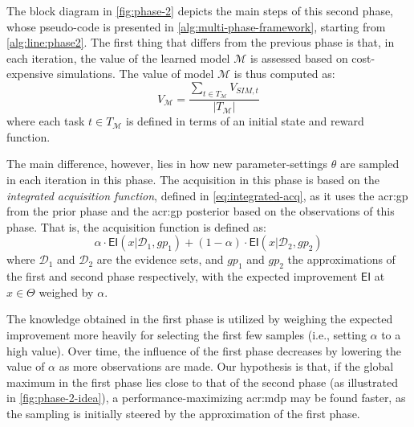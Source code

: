 The block diagram in \autoref{fig:phase-2} depicts the main steps of this second phase, whose pseudo-code is presented in \autoref{alg:multi-phase-framework}, starting from \autoref{alg:line:phase2}.
The first thing that differs from the previous phase is that, in each iteration, the value of the learned model $\mathcal{M}$ is assessed based on cost-expensive simulations.
The value of model $\mathcal{M}$ is thus computed as:
\begin{equation*}
V_\mathcal{M} = \frac{\sum_{t \in T_\mathcal{M}} V_{\mathit{SIM}, t}}{|T_\mathcal{M}|}
\end{equation*}
\noindent where each task $t \in T_\mathcal{M}$ is defined in terms of an initial state and reward function.

The main difference, however, lies in how new parameter-settings $\theta$ are sampled in each iteration in this phase.
The acquisition in this phase is based on the \textit{integrated acquisition function}, defined in \autoref{eq:integrated-acq}, as it uses the \acrshort{acr:gp} from the prior phase and the \acrshort{acr:gp} posterior based on the observations of this phase.
That is, the acquisition function is defined as:
$$\alpha\cdot\mathsf{EI}(x\vert\mathcal{D}_1, \mathit{gp}_1) + (1 - \alpha)\cdot\mathsf{EI}(x\vert\mathcal{D}_2, \mathit{gp}_2)$$
\noindent where $\mathcal{D}_1$ and $\mathcal{D}_2$ are the evidence sets, and $\mathit{gp}_1$ and $\mathit{gp}_2$ the  approximations of the first and second phase respectively, with the expected improvement $\mathsf{EI}$ at $x \in \Theta$ weighed by $\alpha$.

The knowledge obtained in the first phase is utilized by weighing the expected improvement more heavily for selecting the first few samples (i.e., setting $\alpha$ to a high value).
Over time, the influence of the first phase decreases by lowering the value of $\alpha$ as more observations are made.
Our hypothesis is that, if the global maximum in the first phase lies close to that of the second phase (as illustrated in \autoref{fig:phase-2-idea}), a performance-maximizing \acrshort{acr:mdp} may be found faster, as the sampling is initially steered by the approximation of the first phase.




